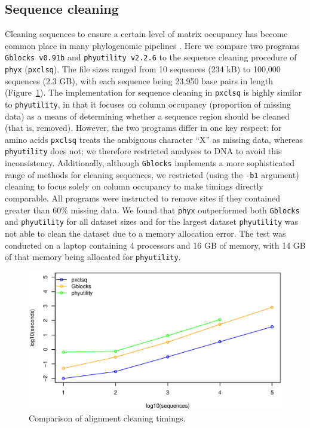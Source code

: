 \documentclass{article}
\begin{document}
\subsection{Sequence cleaning}
Cleaning sequences to ensure a certain level of matrix occupancy has become common place in many phylogenomic pipelines \citep{Dunn2013,YangSmith2014}. Here we compare two programs \texttt{Gblocks v0.91b} \citep{Gblocks} and \texttt{phyutility v2.2.6} \citep{SmithDunn2008} to the sequence cleaning procedure of \texttt{phyx} (\texttt{pxclsq}). The file sizes ranged from 10 sequences (234 kB) to 100,000 sequences (2.3 GB), with each sequence being 23,950 base pairs in length (Figure~\ref{fig:S1}). The implementation for sequence cleaning in \texttt{pxclsq} is highly similar to \texttt{phyutility}, in that it focuses on column occupancy (proportion of missing data) as a means of determining whether a sequence region should be cleaned (that is, removed). However, the two programs differ in one key respect: for amino acids \texttt{pxclsq} treats the ambiguous character ``X'' as missing data, whereas \texttt{phyutility} does not; we therefore restricted analyses to DNA to avoid this inconsistency. Additionally, although \texttt{Gblocks} implements a more sophisticated range of methods for cleaning sequences, we restricted (using the \texttt{-b1} argument) cleaning to focus solely on column occupancy to make timings directly comparable. All programs were instructed to remove sites if they contained greater than 60\% missing data. We found that \texttt{phyx} outperformed both \texttt{Gblocks} and \texttt{phyutility} for all dataset sizes and for the largest dataset \texttt{phyutility} was not able to clean the dataset due to a memory allocation error. The test was conducted on a laptop  containing 4 processors and 16 GB of memory, with 14 GB of that memory being allocated for \texttt{phyutility}.

\begin{figure}[!htbp]
    \centering
    \includegraphics[width=5.0in]{clsq.eps}
    \caption{Comparison of alignment cleaning timings.}
    \label{cleaningfigure}
\label{fig:S1}
\end{figure}
\end{document}
